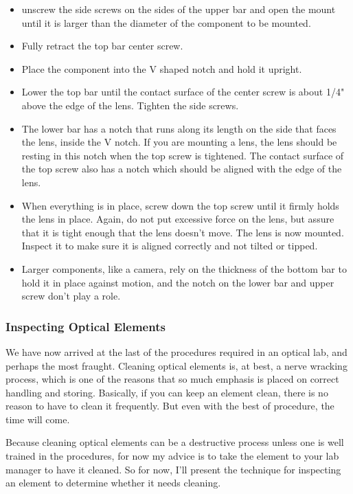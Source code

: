 \documentclass[11pt]{article}
\begin{document}
\begin{itemize}[noitemsep]
    \item unscrew the side screws on the sides of the upper bar and open the mount until it is larger than the diameter of the component to be mounted.
    \item Fully retract the top bar center screw.
    \item Place the component into the V shaped notch and hold it upright.
    \item Lower the top bar until the contact surface of the center screw is about 1/4" above the edge of the lens. Tighten the side screws.
    \item The lower bar has a notch that runs along its length on the side that faces the lens, inside the V notch. If you are mounting a lens, the lens should be resting in this notch when the top screw is tightened. The contact surface of the top screw also has a notch which should be aligned with the edge of the lens.
    \item When everything is in place, screw down the top screw until it firmly holds the lens in place. Again, do not put excessive force on the lens, but assure that it is tight enough that the lens doesn't move. The lens is now mounted. Inspect it to make sure it is aligned correctly and not tilted or tipped.
    \item Larger components, like a camera, rely on the thickness of the bottom bar to hold it in place against motion, and the notch on the lower bar and upper screw don't play a role.
\end{itemize}

\subsubsection{Inspecting Optical Elements}

We have now arrived at the last of the procedures required in an optical lab, and perhaps the most fraught. Cleaning optical elements is, at best, a nerve wracking process, which is one of the reasons that so much emphasis is placed on correct handling and storing. Basically, if you can keep an element clean, there is no reason to have to clean it frequently. But even with the best of procedure, the time will come.

Because cleaning optical elements can be a destructive process unless one is well trained in the procedures, for now my advice is to take the element to your lab manager to have it cleaned. So for now, I'll present the technique for inspecting an element to determine whether it needs cleaning.
\end{document}
